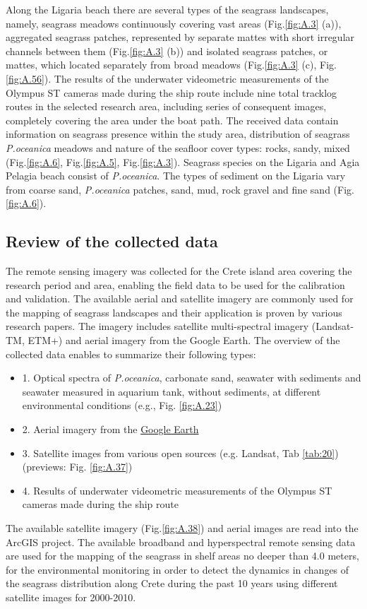 \documentclass[11pt]{article}
\begin{document}
Along the Ligaria beach there are several types of the seagrass landscapes, namely, seagrass meadows
continuously covering vast areas (Fig.\ref{fig:A.3} (a)), aggregated seagrass patches, represented by separate mattes with short irregular channels between them (Fig.\ref{fig:A.3} (b)) and isolated seagrass patches, or mattes,
which located separately from broad meadows (Fig.\ref{fig:A.3} (c), Fig.\ref{fig:A.56}).
The results of the underwater videometric measurements of the \ac{Olympus ST} cameras made during the
ship route include nine total tracklog routes in the selected research area, including series of
consequent images, completely covering the area under the boat path. The received data contain
information on seagrass presence within the study area, distribution of seagrass \textit{P.oceanica} meadows
and nature of the seafloor cover types: rocks, sandy, mixed (Fig.\ref{fig:A.6}, Fig.\ref{fig:A.5}, Fig.\ref{fig:A.3}). Seagrass species on the Ligaria and Agia Pelagia beach consist of \textit{P.oceanica}. The types of sediment on the Ligaria vary from coarse sand,
\textit{P.oceanica} patches, sand, mud, rock gravel and fine sand (Fig.\ref{fig:A.6}).

\subsection{Review of the collected data}
The remote sensing imagery was collected for the Crete island area covering the research period and
area, enabling the field data to be used for the calibration and validation. The available aerial and
satellite imagery are commonly used for the mapping of seagrass landscapes and their application is
proven by various research papers. The imagery includes satellite multi-spectral imagery (Landsat-TM,
ETM+) and aerial imagery from the Google Earth.
The overview of the collected data enables to summarize their following types:
\begin{itemize}
	\item[] 1. Optical spectra of \textit{P.oceanica}, carbonate sand, seawater with sediments and seawater measured in aquarium tank, without sediments, at different environmental conditions (e.g., Fig. \ref{fig:A.23})
	\item[]2. Aerial imagery from the \href{http://www.google.com/earth/index.html}{Google Earth}
	\item[]3. Satellite images from various open sources (e.g. Landsat, Tab \ref{tab:20}) (previews: Fig. \ref{fig:A.37})
	\item[]4. Results of underwater videometric measurements of the \ac{Olympus ST} cameras made during the ship route
\end{itemize}
The available satellite imagery (Fig.\ref{fig:A.38}) \label{page-30}and aerial images are read into the ArcGIS project.
The available broadband and hyperspectral remote sensing data are used for the mapping of the
seagrass in shelf areas no deeper than 4.0 meters, for the environmental monitoring in order to detect
the dynamics in changes of the seagrass distribution along Crete during the past 10 years using
different satellite images for 2000-2010.
\end{document}
